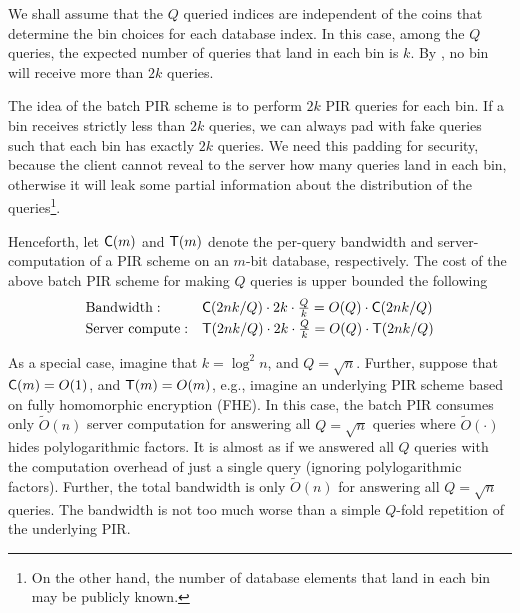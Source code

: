 We shall assume that the $Q$ queried indices are independent
of the coins that determine the bin choices for each database index.
In this case, among the $Q$ queries, 
 the expected number of queries  
that land in each bin 
is $k$. 
By , 
no bin will receive more than $2k$ queries.

The idea of the batch PIR scheme
is to perform $2k$ PIR queries for each bin.  
If a bin receives strictly less than $2k$ queries, we can always
pad with fake queries such that each bin has exactly $2k$ queries.
We need this padding for security, 
because the client cannot reveal  
to the server how many queries land in each bin, otherwise
it will leak some partial information about the 
distribution of the queries\footnote{On the other hand, the number of database elements
that land in each bin may be publicly known.}.


Henceforth, let ${\sf C}(m)$ 
and ${\sf T}(m)$
denote the per-query bandwidth and server-computation 
of a PIR scheme on an $m$-bit database, 
respectively.
The cost of the above batch
PIR scheme for making $Q$ queries is upper bounded 
the following
\[
\begin{array}{ll}
\text{Bandwidth}: & {\sf C}(2nk/Q) \cdot 2k \cdot \frac{Q}{k}  =  O(Q) \cdot {\sf C}(2nk/Q) \\[2pt]
\text{Server compute}: &   {\sf T}(2nk/Q) \cdot 2k  \cdot \frac{Q}{k}
= O(Q) \cdot  {\sf T}(2nk/Q) 
\end{array}
\]

As a special case, imagine that $k = \log^2 n$, 
and $Q = \sqrt{n}$. Further, suppose that  
${\sf C}(m) = O(1)$, 
and ${\sf T}(m) = O(m)$, e.g., 
imagine an underlying PIR scheme based on fully homomorphic
encryption (FHE).
In this case, 
the batch PIR consumes only $\widetilde{O}(n)$  
server computation for answering all $Q = \sqrt{n}$ queries where $\widetilde{O}(\cdot)$ hides polylogarithmic factors.
It is almost as if we answered all $Q$
queries with the computation overhead of just a single 
query (ignoring polylogarithmic factors).
Further, the total bandwidth
is only $\widetilde{O}(n)$ for answering   
all $Q = \sqrt{n}$ queries. The bandwidth is not too much worse
than a simple $Q$-fold repetition of the underlying PIR.



